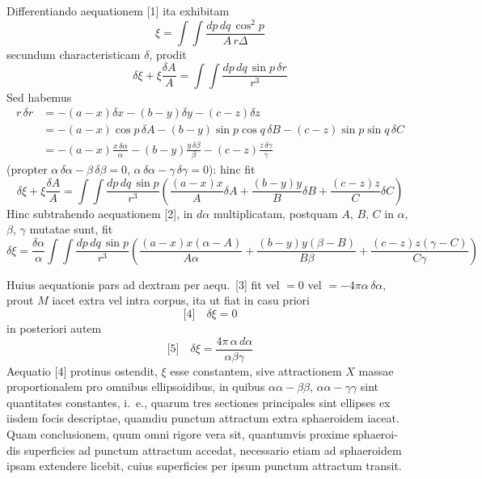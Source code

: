 \documentclass[12pt,a4paper]{article}
\theoremstyle{gauss}
\begin{document}
Differentiando aequationem [1] ita exhibitam
\[
\xi = \int\!\!\int \frac{dp\,dq\,\cos^2 p}{A\,r\Delta}
\]
secundum characteristicam $\delta$, prodit
\[
\delta\xi + \xi\frac{\delta A}{A} = \int\!\!\int \frac{dp\,dq\,\sin p\,\delta r}{r^3}
\]
Sed habemus
\begin{align*}
r\,\delta r &= -(a-x)\delta x - (b-y)\delta y - (c-z)\delta z \\
&= -(a-x)\cos p\,\delta A - (b-y)\sin p\cos q\,\delta B - (c-z)\sin p\sin q\,\delta C \\
&= -(a-x)\frac{x\,\delta\alpha}{\alpha} - (b-y)\frac{y\,\delta\beta}{\beta} - (c-z)\frac{z\,\delta\gamma}{\gamma}
\end{align*}
(propter $\alpha\,\delta\alpha - \beta\,\delta\beta = 0$, $\alpha\,\delta\alpha - \gamma\,\delta\gamma = 0$): hinc fit
\[
\delta\xi + \xi\frac{\delta A}{A} = \int\!\!\int \frac{dp\,dq\,\sin p}{r^3}\left(\frac{(a-x)x}{A}\delta A + \frac{(b-y)y}{B}\delta B + \frac{(c-z)z}{C}\delta C\right)
\]
Hinc subtrahendo aequationem [2], in $d\alpha$ multiplicatam, postquam $A$, $B$, $C$
in $\alpha$, $\beta$, $\gamma$ mutatae sunt, fit
\[
\delta\xi = \frac{\delta\alpha}{\alpha}\int\!\!\int \frac{dp\,dq\,\sin p}{r^3}\left(\frac{(a-x)x(\alpha-A)}{A\alpha} + \frac{(b-y)y(\beta-B)}{B\beta} + \frac{(c-z)z(\gamma-C)}{C\gamma}\right)
\]

\newpage
\setcounter{page}{26}

Huius aequationis pars ad dextram per aequ.~[3] fit vel $=0$ vel $=-4\pi\alpha\,\delta\alpha$,
prout $M$ iacet extra vel intra corpus, ita ut fiat in casu priori
\[
\text{[4]}\quad \delta\xi = 0
\]
in posteriori autem
\[
\text{[5]}\quad \delta\xi = \frac{4\pi\,\alpha\,d\alpha}{\alpha\beta\gamma}
\]
Aequatio [4] protinus ostendit, $\xi$ esse constantem, sive attractionem $X$
massae proportionalem pro omnibus ellipsoidibus, in quibus $\alpha\alpha-\beta\beta$, $\alpha\alpha-\gamma\gamma$
sint quantitates constantes, i.~e., quarum tres sectiones principales sint ellipses
ex iisdem focis descriptae, quamdiu punctum attractum extra sphaeroidem iaceat.
Quam conclusionem, quum omni rigore vera sit, quantumvis proxime sphaeroi-
dis superficies ad punctum attractum accedat, necessario etiam ad sphaeroidem
ipsam extendere licebit, cuius superficies per ipsum punctum attractum transit.
\end{document}
